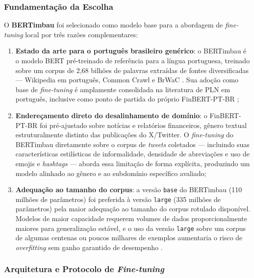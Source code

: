 \subsubsection{Fundamentação da Escolha}
\label{subsubsec:justificativa_bertimbau}

O \textbf{BERTimbau} \cite{souza2020} foi selecionado como modelo base para a abordagem de \textit{fine-tuning} local por três razões complementares:

\begin{enumerate}
	\item \textbf{Estado da arte para o português brasileiro genérico}: o BERTimbau é o modelo BERT pré-treinado de referência para a língua portuguesa, treinado sobre um corpus de 2,68 bilhões de palavras extraídas de fontes diversificadas --- Wikipedia em português, Common Crawl e BrWaC \cite{souza2020}. Sua adoção como base de \textit{fine-tuning} é amplamente consolidada na literatura de PLN em português, inclusive como ponto de partida do próprio FinBERT-PT-BR \cite{santos2023finbert};
	
	\item \textbf{Endereçamento direto do desalinhamento de domínio}: o FinBERT-PT-BR foi pré-ajustado sobre notícias e relatórios financeiros, gênero textual estruturalmente distinto das publicações do X/Twitter. O \textit{fine-tuning} do BERTimbau diretamente sobre o corpus de \textit{tweets} coletados --- incluindo suas características estilísticas de informalidade, densidade de abreviações e uso de emojis e \textit{hashtags} --- aborda essa limitação de forma explícita, produzindo um modelo alinhado ao gênero e ao subdomínio específico avaliado;
	
	\item \textbf{Adequação ao tamanho do corpus}: a versão \texttt{base} do BERTimbau (110 milhões de parâmetros) foi preferida à versão \texttt{large} (335 milhões de parâmetros) pela maior adequação ao tamanho do corpus rotulado disponível. Modelos de maior capacidade requerem volumes de dados proporcionalmente maiores para generalização estável, e o uso da versão \texttt{large} sobre um corpus de algumas centenas ou poucos milhares de exemplos aumentaria o risco de \textit{overfitting} sem ganho garantido de desempenho \cite{devlin2019}.
\end{enumerate}

\subsubsection{Arquitetura e Protocolo de \textit{Fine-tuning}}
\label{subsubsec:arquitetura_bertimbau}

